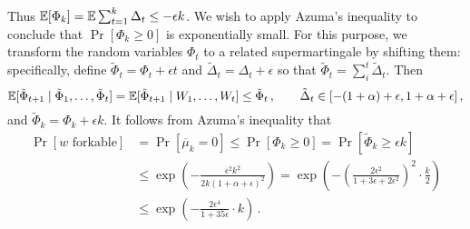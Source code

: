   \noindent
  Thus $
  \operatorname{\mathbb{E}}[\Phi_k] = \operatorname{\mathbb{E}} \sum_{t=1}^k \Delta_t  
  \leq -\epsilon k
  $. 
  We wish to apply Azuma's inequality to conclude that
  $\Pr[\Phi_k \geq 0]$ is exponentially small. For this purpose, we
  transform the random variables $\Phi_t$ to a related supermartingale by
  shifting them: specifically, define
  $\tilde{\Phi}_t = \Phi_t + \epsilon t$ and
  $\tilde{\Delta}_t = \Delta_t + \epsilon$ so that
  $\tilde{\Phi}_t = \sum_i^t \tilde{\Delta}_t$. Then
  \[
    \operatorname{\mathbb{E}}[\tilde{\Phi}_{t+1} \mid \tilde{\Phi}_1, \ldots,
    \tilde{\Phi}_{t}] = \operatorname{\mathbb{E}}[\tilde{\Phi}_{t+1} \mid W_1, \ldots,
    W_{t}]\leq \tilde{\Phi}_t\,,
    \qquad
    \tilde{\Delta}_t \in [-(1 + \alpha) + \epsilon, 1+ \alpha +
    \epsilon]\,,
  \]
  and $\tilde{\Phi}_k = \Phi_k + \epsilon k$. It follows
  from Azuma's inequality that
  \begin{align}\label{eq:azuma-bound}
    \Pr[\text{$w$ forkable}] 
    &= \Pr[\overline{\mu}_k = 0] \leq \Pr[\Phi_k \geq 0] = \Pr[\tilde{\Phi}_k \geq \epsilon k] 
    \nonumber \\ 
    &\leq \exp\left(-\frac{\epsilon^2 k^2}{2k (1 + \alpha + \epsilon)^2}\right)
       = \exp\left(-\left(\frac{2 \epsilon^2}{1 + 3 \epsilon + 2\epsilon^2}\right)^2 \cdot \frac{k}{2}\right) \nonumber \\
    &\leq \exp\left(-\frac{2\epsilon^4}{1 + 35\epsilon} \cdot k\right)
    \,.
  \end{align}


\newcommand{\muxr}{\mu_x^{(r)}}
\newcommand{\Snr}{S_k^{(r)}}
\newcommand{\Sr}{S^{(r)}}
\newcommand{\Srstar}{S^{(r^*)}}
\newcommand{\event}[1]{\mathsf{#1}}
\newcommand{\notevent}[1]{\overline{\event{#1}}}


